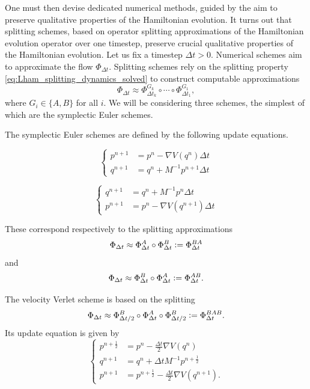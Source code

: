     One must then devise dedicated numerical methods, guided by the aim to preserve qualitative properties of the Hamiltonian evolution. It turns out that splitting schemes, based on operator splitting approximations of the Hamiltonian evolution operator over one timestep, preserve crucial qualitative properties of the Hamiltonian evolution.
    Let us fix a timestep $\Delta t>0$. Numerical schemes aim to approximate the flow $\Phi_{\Delta t}$. Splitting schemes rely on the splitting property \eqref{eq:Lham_splitting_dynamics_solved} to construct computable approximations
    \[\Phi_{\Delta t}\approx \Phi^{G_k}_{\Delta t_k}\circ \dotsm \circ \Phi^{G_1}_{\Delta t_1},\]
    where $G_i\in\{A,B\}$ for all $i$. We will be considering three schemes, the simplest of which are the symplectic Euler schemes.
    
    The symplectic Euler schemes are defined by the following update equations.
    
    \begin{equation}\label{eq:symplectic_euler_A}
    \left\{\begin{aligned}
         p^{n+1} &=p^n -\nabla V(q^n)\Delta t\\
         q^{n+1} &=q^n + M^{-1}p^{n+1}\Delta t
    \end{aligned}\right.
    \end{equation}

    \begin{equation}\label{eq:symplectic_euler_B}
        \left\{\begin{aligned}
             q^{n+1} &=q^n +M^{-1}p^n\Delta t\\
             p^{n+1} &=p^n - \nabla V(q^{n+1})\Delta t
        \end{aligned}\right.
    \end{equation}

    These correspond respectively to the splitting approximations 
    \[\Phi_{\Delta t}\approx \Phi_{\Delta t}^A\circ\Phi_{\Delta t}^B\mathrel{\mathop:}= \Phi_{\Delta t}^{BA}\]
    and
    \[\Phi_{\Delta t}\approx \Phi_{\Delta t}^B\circ\Phi_{\Delta t}^A\mathrel{\mathop:}= \Phi_{\Delta t}^{AB}.\]
    
    The velocity Verlet scheme is based on the splitting
    \[\Phi_{\Delta t}\approx \Phi_{\Delta t/2}^B\circ\Phi_{\Delta t}^A\circ\Phi_{\Delta t/2}^B\mathrel{\mathop:}= \Phi_{\Delta t}^{BAB}.\]
    Its update equation is given by
    \begin{equation}\label{eq:verlet}
        \left\{\begin{aligned}
             p^{n+\frac12} &=p^n -\frac{\Delta t}{2}\nabla V(q^n)\\
             q^{n+1} &=q^n + \Delta t M^{-1}p^{n+\frac 12}\\
             p^{n+1} &= p^{n+\frac12}-\frac{\Delta t}{2}\nabla V(q^{n+1}).
        \end{aligned}\right.
    \end{equation}
